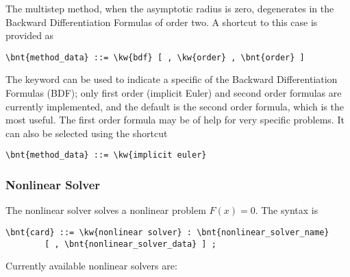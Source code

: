 \noindent
The multistep method, when the asymptotic radius is zero, degenerates
in the Backward Differentiation Formulas of order two.
A shortcut to this case is provided as
\begin{Verbatim}[commandchars=\\\{\}]
    \bnt{method_data} ::= \kw{bdf} [ , \kw{order} , \bnt{order} ]
\end{Verbatim}
The keyword  can be used to indicate a specific 
of the Backward Differentiation Formulas (BDF); only first order (implicit Euler) and 
second order formulas are currently implemented, and the default
is the second order formula, which is the most useful.
The first order formula may be of help for very specific problems.
It can also be selected using the shortcut
\begin{Verbatim}[commandchars=\\\{\}]
    \bnt{method_data} ::= \kw{implicit euler}
\end{Verbatim}

\subsubsection{Nonlinear Solver}
The nonlinear solver solves a nonlinear problem $F(x)=0$.
The syntax is
\begin{Verbatim}[commandchars=\\\{\}]
    \bnt{card} ::= \kw{nonlinear solver} : \bnt{nonlinear_solver_name}
        [ , \bnt{nonlinear_solver_data} ] ;
\end{Verbatim}
Currently available nonlinear solvers are:

